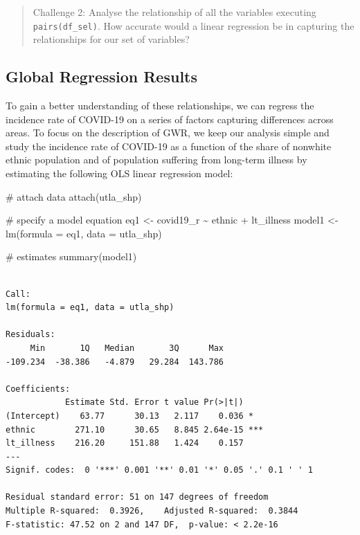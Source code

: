 \documentclass[
  letterpaper,
  DIV=11,
  numbers=noendperiod,
  oneside]{scrreprt}
\newenvironment{Shaded}{\begin{snugshade}}{\end{snugshade}}
\newcommand{\AttributeTok}[1]{\textcolor[rgb]{0.40,0.45,0.13}{#1}}
\newcommand{\CommentTok}[1]{\textcolor[rgb]{0.37,0.37,0.37}{#1}}
\newcommand{\FunctionTok}[1]{\textcolor[rgb]{0.28,0.35,0.67}{#1}}
\newcommand{\NormalTok}[1]{\textcolor[rgb]{0.00,0.23,0.31}{#1}}
\newcommand{\OtherTok}[1]{\textcolor[rgb]{0.00,0.23,0.31}{#1}}
\newcommand{\SpecialCharTok}[1]{\textcolor[rgb]{0.37,0.37,0.37}{#1}}
\begin{document}
\begin{quote}
Challenge 2: Analyse the relationship of all the variables executing
\texttt{pairs(df\_sel)}. How accurate would a linear regression be in
capturing the relationships for our set of variables?
\end{quote}

\subsection{Global Regression Results}\label{global-regression-results}

To gain a better understanding of these relationships, we can regress
the incidence rate of COVID-19 on a series of factors capturing
differences across areas. To focus on the description of GWR, we keep
our analysis simple and study the incidence rate of COVID-19 as a
function of the share of nonwhite ethnic population and of population
suffering from long-term illness by estimating the following OLS linear
regression model:

\begin{Shaded}
\begin{Highlighting}[]
\CommentTok{\# attach data}
\FunctionTok{attach}\NormalTok{(utla\_shp)}

\CommentTok{\# specify a model equation}
\NormalTok{eq1 }\OtherTok{\textless{}{-}}\NormalTok{ covid19\_r }\SpecialCharTok{\textasciitilde{}}\NormalTok{ ethnic }\SpecialCharTok{+}\NormalTok{ lt\_illness}
\NormalTok{model1 }\OtherTok{\textless{}{-}} \FunctionTok{lm}\NormalTok{(}\AttributeTok{formula =}\NormalTok{ eq1, }\AttributeTok{data =}\NormalTok{ utla\_shp)}

\CommentTok{\# estimates}
\FunctionTok{summary}\NormalTok{(model1)}
\end{Highlighting}
\end{Shaded}

\begin{verbatim}

Call:
lm(formula = eq1, data = utla_shp)

Residuals:
     Min       1Q   Median       3Q      Max 
-109.234  -38.386   -4.879   29.284  143.786 

Coefficients:
            Estimate Std. Error t value Pr(>|t|)    
(Intercept)    63.77      30.13   2.117    0.036 *  
ethnic        271.10      30.65   8.845 2.64e-15 ***
lt_illness    216.20     151.88   1.424    0.157    
---
Signif. codes:  0 '***' 0.001 '**' 0.01 '*' 0.05 '.' 0.1 ' ' 1

Residual standard error: 51 on 147 degrees of freedom
Multiple R-squared:  0.3926,    Adjusted R-squared:  0.3844 
F-statistic: 47.52 on 2 and 147 DF,  p-value: < 2.2e-16
\end{verbatim}
\end{document}
